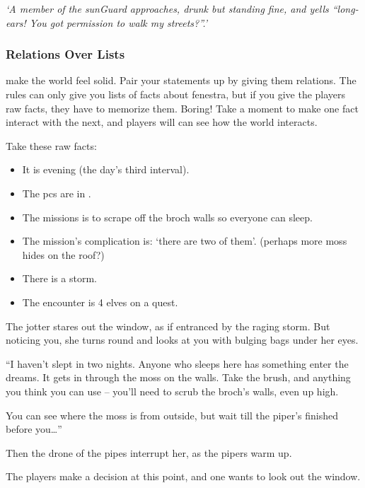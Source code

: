 \begin{multicols}{2}
\textit{`A member of the \gls{sunGuard} approaches, drunk but standing fine, and yells ``long-ears! You got permission to walk my streets?''.'}

\subsubsection{Relations Over Lists}
make the world feel solid.
Pair your statements up by giving them relations.
The rules can only give you lists of facts about \gls{fenestra}, but if you give the players raw facts, they have to memorize them.
Boring!
Take a moment to make one fact interact with the next, and players will can see how the world interacts.

Take these raw facts:

\begin{itemize}
  \item
  It is evening (the day's third \gls{interval}).
  \item
  The \glspl{pc} are in .
  \item
  The missions is to scrape  off the \gls{broch} walls so everyone can sleep.
  \item
  The mission's complication is: `there are two of them'.
  (perhaps more moss hides on the roof?)
  \item
  There is a storm.
  \item
  The encounter is 4 elves on a quest.
\end{itemize}

\begin{boxtext}
  The \gls{jotter} stares out the window, as if entranced by the raging storm.
  But noticing you, she turns round and looks at you with bulging bags under her eyes.

  ``I haven't slept in two nights.
  Anyone who sleeps here has something enter the dreams.
  It gets in through the moss on the walls.
  Take the brush, and anything you think you can use -- you'll need to scrub the \gls{broch}'s walls, even up high.

  You can see where the moss is from outside, but wait till the piper's finished before you\ldots''

  Then the drone of the pipes interrupt her, as the pipers warm up.
\end{boxtext}

The players make a decision at this point, and one wants to look out the window.


\end{multicols}
